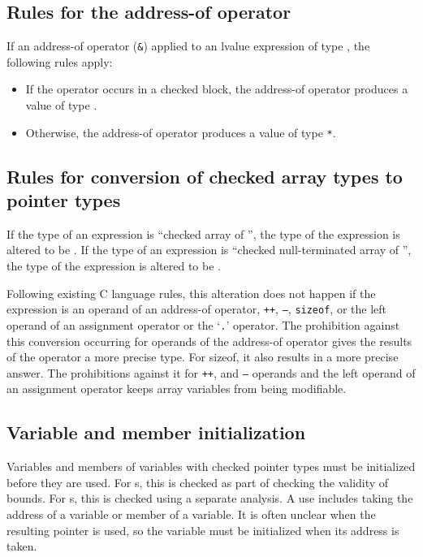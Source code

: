\subsection{Rules for the address-of operator}

If an address-of operator (\texttt{\&}) applied to an lvalue expression
of type , the following rules apply:

\begin{itemize}
\item
  If the operator occurs in a checked block, the address-of operator
  produces a value of type \arrayptrT.
\item
  Otherwise, the address-of operator produces a value of type 
  \texttt{*}.
\end{itemize}

\subsection{Rules for conversion of checked array types to pointer types}

If the type of an expression is ``checked array of
'', the type of the expression is altered to be
\arrayptrT.  If the type of an expression is ``checked null-terminated
array of '', the type of the expression is altered to
be \ntarrayptrT.

Following existing C language rules, this alteration does not happen if
the expression is an operand of an address-of operator, \texttt{++},
\texttt{--}, \texttt{sizeof}, or the left operand of an assignment
operator or the `\texttt{.}' operator. The prohibition against this
conversion occurring for operands of the address-of operator gives the
results of the operator a more precise type. For sizeof, it also results
in a more precise answer. The prohibitions against it for \texttt{++}, and
\texttt{--} operands and the left operand of an assignment operator keeps array
variables from being modifiable.

\subsection{Variable and member initialization}

Variables and members of variables with checked pointer types must be initialized
before they are used.  For \arrayptr s, this is checked as part of checking
the validity of bounds.  For \ptr s, this is checked
using a separate analysis.   A use includes taking the address of a variable
or member of a variable.  It is often unclear when the resulting pointer is used,
so the variable must be initialized when its address is taken.

